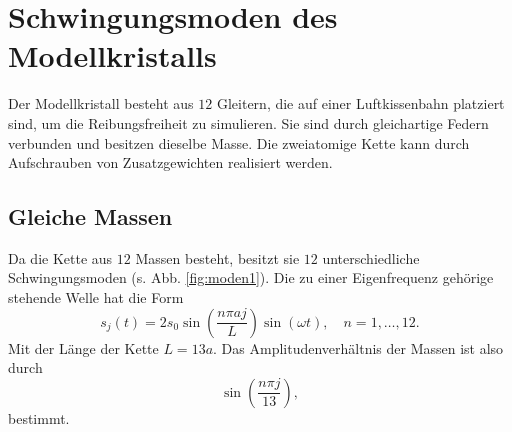 \section{Schwingungsmoden des Modellkristalls}

Der Modellkristall besteht aus $12$ Gleitern, die auf einer Luftkissenbahn platziert sind, um die Reibungsfreiheit zu simulieren. Sie sind durch gleichartige Federn verbunden und besitzen dieselbe Masse. Die zweiatomige Kette kann durch Aufschrauben von Zusatzgewichten realisiert werden.

\subsection{Gleiche Massen}

Da die Kette aus $12$ Massen besteht, besitzt sie $12$ unterschiedliche Schwingungsmoden (s. Abb. \ref{fig:moden1}). Die zu einer Eigenfrequenz gehörige stehende Welle hat die Form
\begin{equation}
 s_{j}(t) = 2s_{0}\sin\left(\frac{n\pi aj}{L}\right)\sin(\omega t), \quad n=1,\dots,12.
\end{equation}
Mit der Länge der Kette $L=13a$. Das Amplitudenverhältnis der Massen ist also durch
\begin{equation}
 \sin\left(\frac{n\pi j}{13}\right),
\end{equation}
bestimmt.

